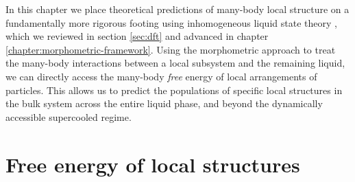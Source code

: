 \documentclass[11pt,twoside]{report}
\begin{document}
In this chapter we place theoretical predictions of many-body local structure on a fundamentally more rigorous footing using inhomogeneous liquid state theory \cite{EvansAP1979}, which we reviewed in section \ref{sec:dft} and advanced in chapter \ref{chapter:morphometric-framework}.
Using the morphometric approach to treat the many-body interactions between a local subsystem and the remaining liquid, we can directly access the many-body \textit{free} energy of local arrangements of particles.
This allows us to predict the populations of specific local structures%
in the bulk system across the entire liquid phase, and beyond the dynamically accessible supercooled regime.

\section{Free energy of local structures}


\end{document}
